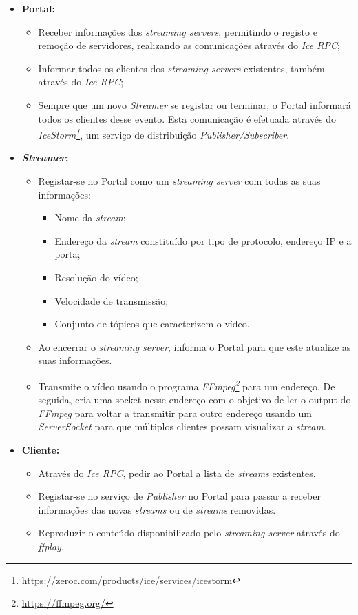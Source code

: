 \documentclass{article}
\begin{document}
\begin{itemize}

	\item \textbf{Portal:}
		\begin{itemize}
			\item Receber informações dos \textit{streaming servers}, permitindo o registo e remoção de servidores, realizando as comunicações através do \textit{Ice RPC};
			\item Informar todos os clientes dos \textit{streaming servers} existentes, também através do \textit{Ice RPC}; 
			\item Sempre que um novo \textit{Streamer} se registar ou terminar, o Portal informará todos os clientes desse evento. Esta comunicação é efetuada através do \textit{IceStorm\footnote{\url{https://zeroc.com/products/ice/services/icestorm}}}, um serviço de distribuição \textit{Publisher/Subscriber}.
		\end{itemize}
		
	\item \textbf{\textit{Streamer}:}
		\begin{itemize}
			\item Registar-se no Portal como um \textit{streaming server} com todas as suas informações:
			\begin{itemize}
				\item Nome da \textit{stream};
				\item Endereço da \textit{stream} constituído por tipo de protocolo, endereço IP e a porta;
				\item Resolução do vídeo;
				\item Velocidade de transmissão;
				\item Conjunto de tópicos que caracterizem o vídeo.
			\end{itemize}
			\item Ao encerrar o \textit{streaming server}, informa o Portal para que este atualize as suas informações.
			\item Transmite o vídeo usando o programa \textit{FFmpeg\footnote{\url{https://ffmpeg.org/}}} para um endereço. De seguida,  cria uma socket nesse endereço com o objetivo de ler o output do \textit{FFmpeg} para voltar a transmitir para outro endereço usando um \textit{ServerSocket} para que múltiplos clientes possam visualizar a \textit{stream}.
		\end{itemize}

	\item \textbf{Cliente:}
		\begin{itemize}
			\item Através do \textit{Ice RPC}, pedir ao Portal a lista de \textit{streams} existentes.
			\item Registar-se no serviço de \textit{Publisher} no Portal para passar a receber informações das novas \textit{streams} ou de \textit{streams} removidas.
			\item Reproduzir o conteúdo disponibilizado pelo \textit{streaming server} através do \textit{ffplay}.
		\end{itemize}
\end{itemize}
\end{document}
